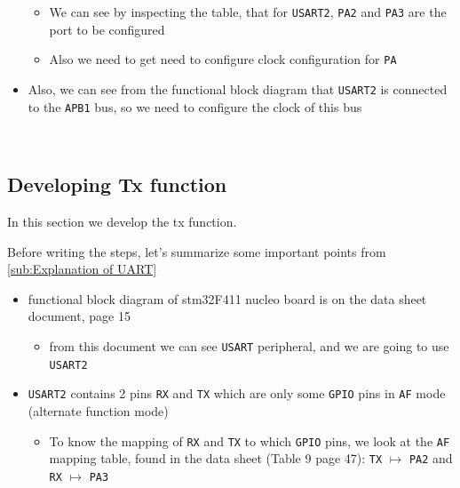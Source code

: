 \documentclass[12pt,a4paper]{book}
\begin{document}
\begin{itemize}
    \begin{itemize}
        \item We can see by inspecting the table, that for \verb|USART2|, \verb|PA2| and \verb|PA3| are the port to be configured

        \item  Also we need to get need to configure clock configuration for \verb|PA|
    \end{itemize}

\item  Also, we can see from the functional block diagram that \verb|USART2| is connected to the \verb|APB1| bus, so we need to configure the clock of this bus 

\end{itemize}

\
\subsection{Developing Tx function}

In this section we develop the tx function.

Before writing the steps, let's summarize some important points from \ref{sub:Explanation of UART}

\begin{itemize}
    \item functional block diagram of stm32F411 nucleo board is on the data sheet document, page 15

        \begin{itemize}
            \item from this document we can see \verb|USART| peripheral, and we are going to use \verb|USART2|
        \end{itemize}

    \item  \verb|USART2| contains 2 pins \verb|RX| and \verb|TX| which are only some \verb|GPIO| pins in \verb|AF| mode (alternate function mode)

        \begin{itemize}
            \item To know the mapping of \verb|RX| and \verb|TX| to which \verb|GPIO| pins, we look at the \verb|AF| mapping table, found in the data sheet (Table 9 page 47): \verb|TX| $\mapsto$ \verb|PA2| and \verb|RX| $\mapsto$ \verb|PA3|
        \end{itemize}
    
\end{itemize}
\end{document}

